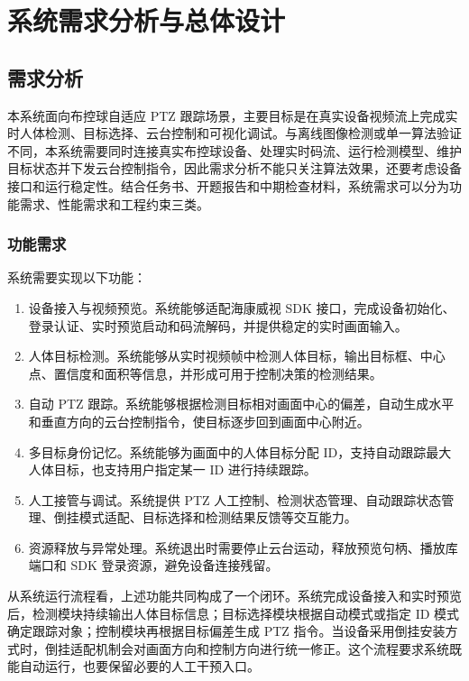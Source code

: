\chapter{系统需求分析与总体设计}

\section{需求分析}

本系统面向布控球自适应 PTZ 跟踪场景，主要目标是在真实设备视频流上完成实时人体检测、目标选择、云台控制和可视化调试。与离线图像检测或单一算法验证不同，本系统需要同时连接真实布控球设备、处理实时码流、运行检测模型、维护目标状态并下发云台控制指令，因此需求分析不能只关注算法效果，还要考虑设备接口和运行稳定性。结合任务书、开题报告和中期检查材料，系统需求可以分为功能需求、性能需求和工程约束三类。

\subsection{功能需求}

系统需要实现以下功能：

\begin{enumerate}
    \item 设备接入与视频预览。系统能够适配海康威视 SDK 接口，完成设备初始化、登录认证、实时预览启动和码流解码，并提供稳定的实时画面输入。
    \item 人体目标检测。系统能够从实时视频帧中检测人体目标，输出目标框、中心点、置信度和面积等信息，并形成可用于控制决策的检测结果。
    \item 自动 PTZ 跟踪。系统能够根据检测目标相对画面中心的偏差，自动生成水平和垂直方向的云台控制指令，使目标逐步回到画面中心附近。
    \item 多目标身份记忆。系统能够为画面中的人体目标分配 ID，支持自动跟踪最大人体目标，也支持用户指定某一 ID 进行持续跟踪。
    \item 人工接管与调试。系统提供 PTZ 人工控制、检测状态管理、自动跟踪状态管理、倒挂模式适配、目标选择和检测结果反馈等交互能力。
    \item 资源释放与异常处理。系统退出时需要停止云台运动，释放预览句柄、播放库端口和 SDK 登录资源，避免设备连接残留。
\end{enumerate}

从系统运行流程看，上述功能共同构成了一个闭环。系统完成设备接入和实时预览后，检测模块持续输出人体目标信息；目标选择模块根据自动模式或指定 ID 模式确定跟踪对象；控制模块再根据目标偏差生成 PTZ 指令。当设备采用倒挂安装方式时，倒挂适配机制会对画面方向和控制方向进行统一修正。这个流程要求系统既能自动运行，也要保留必要的人工干预入口。

